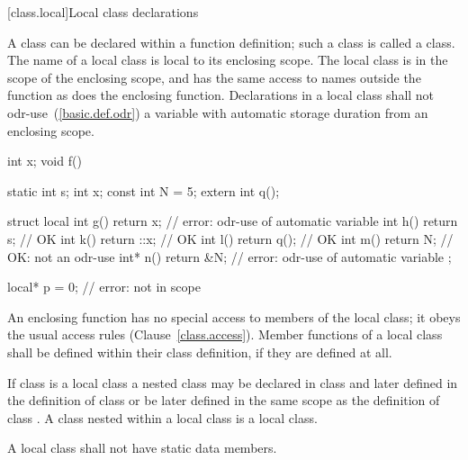 [class.local]{Local class declarations}
%
%

\pnum
A class can be declared within a function definition; such a class is
called a  class. The name of a local class is local to
its enclosing scope.
%
The local class is in the scope of the enclosing scope, and has the same
access to names outside the function as does the enclosing function.
Declarations in a local class
shall not odr-use~(\ref{basic.def.odr}) a variable with automatic storage
duration from an
enclosing scope.
\begin{example}
%
\begin{codeblock}
int x;
void f() {
  static int s;
  int x;
  const int N = 5;
  extern int q();

  struct local {
    int g() { return x; }       // error: odr-use of automatic variable 
    int h() { return s; }       // OK
    int k() { return ::x; }     // OK
    int l() { return q(); }     // OK
    int m() { return N; }       // OK: not an odr-use
    int* n() { return &N; }     // error: odr-use of automatic variable 
  };
}

local* p = 0;                   // error:  not in scope
\end{codeblock}
\end{example}

\pnum
An enclosing function has no special access to members of the local
class; it obeys the usual access rules (Clause~\ref{class.access}).
%
Member functions of a local class shall be defined within their class
definition, if they are defined at all.

\pnum
{}%
If class  is a local class a nested class  may be
declared in class  and later defined in the definition of class
 or be later defined in the same scope as the definition of
class .
%
A class nested within
a local class is a local class.

\pnum
{}%
A local class shall not have static data members.
